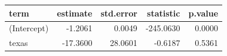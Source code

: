 \begin{table}
\centering\begingroup\fontsize{9}{11}\selectfont

\begin{tabular}[t]{lrrrr}
\toprule
term & estimate & std.error & statistic & p.value\\
\midrule
(Intercept) & -1.2061 & 0.0049 & -245.0630 & 0.0000\\
texas & -17.3600 & 28.0601 & -0.6187 & 0.5361\\
\bottomrule
\end{tabular}
\endgroup{}
\end{table}
